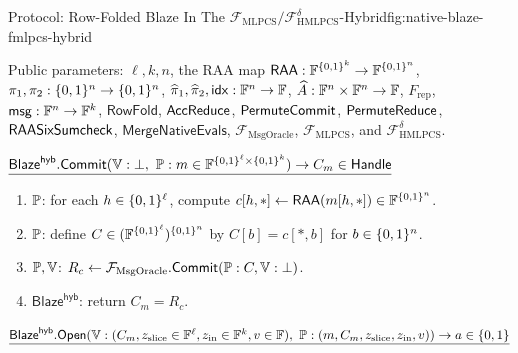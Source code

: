 \begin{protocolbox}{Protocol: Row-Folded Blaze In The \(\mathcal F_{\mathrm{MLPCS}}/\mathcal F_{\mathrm{HMLPCS}}^\delta\)-Hybrid}{fig:native-blaze-fmlpcs-hybrid}
\scriptsize\raggedright
\noindent Public parameters: \(\ell,k,n\), the RAA map
\(\mathsf{RAA}:\mathbb{F}^{\{0,1\}^k}\to\mathbb{F}^{\{0,1\}^n}\), \(\pi_1,\pi_2:\{0,1\}^n\to\{0,1\}^n\),
\(\widehat\pi_1,\widehat\pi_2,\mathsf{idx}:\mathbb{F}^n\to\mathbb{F}\),
\(\widehat A:\mathbb{F}^n\times\mathbb{F}^n\to\mathbb{F}\), \(F_{\mathrm{rep}}\),
\(\mathsf{msg}:\mathbb{F}^n\to\mathbb{F}^k\), \(\mathsf{RowFold}\),
\(\mathsf{AccReduce}\), \(\mathsf{PermuteCommit}\), \(\mathsf{PermuteReduce}\), \(\mathsf{RAASixSumcheck}\),
\(\mathsf{MergeNativeEvals}\),
\(\mathcal F_{\mathrm{MsgOracle}}\), \(\mathcal F_{\mathrm{MLPCS}}\), and
\(\mathcal F_{\mathrm{HMLPCS}}^\delta\).

\smallskip
\noindent\(\underline{\mathsf{Blaze}^{\mathsf{hyb}}.\mathsf{Commit}(\verifier:\bot,\ \prover:m\in\F^{\B^\ell\times\B^k})\to C_m\in\Handle}\)

\smallskip
\begin{enumerate}[leftmargin=0.24in,label=\textbf{C\arabic*.},itemsep=0.06em,topsep=0.06em,parsep=0pt]
  \item \(\mathbb{P}\): for each \(h\in\{0,1\}^\ell\), compute
        \(c[h,\ast]\gets\mathsf{RAA}(m[h,\ast])\in\mathbb{F}^{\{0,1\}^n}\).
  \item \(\mathbb{P}\): define \(C\in(\mathbb{F}^{\{0,1\}^\ell})^{\{0,1\}^n}\) by
        \(C[b]=c[\ast,b]\) for \(b\in\{0,1\}^n\).
  \item \(\mathbb{P},\mathbb{V}\): \(R_c\gets
        \mathcal F_{\mathrm{MsgOracle}}.\mathsf{Commit}
        (\mathbb{P}:C,\mathbb{V}:\bot)\).
  \item \(\mathsf{Blaze}^{\mathsf{hyb}}\): return
        \(C_m=R_c\).
\end{enumerate}

\smallskip
\noindent\(\underline{\mathsf{Blaze}^{\mathsf{hyb}}.\mathsf{Open}(\verifier:(C_m,z_{\mathrm{slice}}\in\F^\ell,z_{\mathrm{in}}\in\F^k,v\in\F),\ \prover:(m,C_m,z_{\mathrm{slice}},z_{\mathrm{in}},v))\to a\in\{0,1\}}\)


\end{protocolbox}
